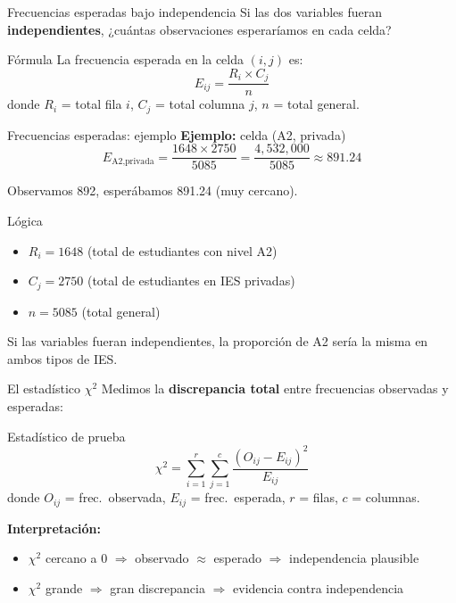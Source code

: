 \documentclass[aspectratio=169, 11pt]{beamer}
\begin{document}
\begin{frame}{Frecuencias esperadas bajo independencia}
Si las dos variables fueran \textbf{independientes}, ¿cuántas observaciones esperaríamos en cada celda?

\vspace{0.2cm}
\begin{block}{Fórmula}
La frecuencia esperada en la celda $(i,j)$ es:
\[
E_{ij} = \frac{R_i \times C_j}{n}
\]
donde $R_i$ = total fila $i$, $C_j$ = total columna $j$, $n$ = total general.
\end{block}
\end{frame}

\begin{frame}{Frecuencias esperadas: ejemplo}
\textbf{Ejemplo:} celda (A2, privada)
\[
E_{\text{A2,privada}} = \frac{1648 \times 2750}{5085} = \frac{4{,}532{,}000}{5085} \approx 891.24
\]

Observamos 892, esperábamos 891.24 (muy cercano).

\vspace{0.3cm}
\begin{block}{Lógica}
\begin{itemize}
  \item $R_i = 1648$ (total de estudiantes con nivel A2)
  \item $C_j = 2750$ (total de estudiantes en IES privadas)
  \item $n = 5085$ (total general)
\end{itemize}
Si las variables fueran independientes, la proporción de A2 sería la misma en ambos tipos de IES.
\end{block}
\end{frame}

\begin{frame}{El estad\'istico $\chi^2$}
Medimos la \textbf{discrepancia total} entre frecuencias observadas y esperadas:

\begin{block}{Estad\'istico de prueba}
\[
\chi^2 = \sum_{i=1}^{r} \sum_{j=1}^{c} \frac{(O_{ij} - E_{ij})^2}{E_{ij}}
\]
\vspace{-0.2cm}
donde $O_{ij}$ = frec.\ observada, $E_{ij}$ = frec.\ esperada, $r$ = filas, $c$ = columnas.
\end{block}

\vspace{0.1cm}
\textbf{Interpretaci\'on:}
\begin{itemize}
  \item $\chi^2$ cercano a 0 $\Rightarrow$ observado $\approx$ esperado $\Rightarrow$ independencia plausible
  \item $\chi^2$ grande $\Rightarrow$ gran discrepancia $\Rightarrow$ evidencia contra independencia
\end{itemize}
\end{frame}
\end{document}
